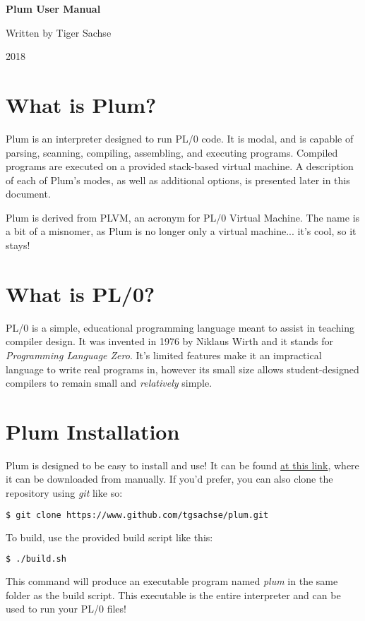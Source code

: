 \documentclass[12pt]{memoir}
\begin{document}
\pagestyle{empty}

\begin{vplace}[.7]
\begin{center}
{\Huge
    \textbf{Plum User Manual}
}

{\Large 
    Written by Tiger Sachse

    2018
}
\end{center}
\end{vplace}

\pagebreak

\pagestyle{plain}
\setcounter{page}{1}

\section*{What is Plum?}
Plum is an interpreter designed to run PL/0 code. It is modal, and is capable of parsing,
scanning, compiling, assembling, and executing programs. Compiled programs are executed
on a provided stack-based virtual machine. A description of each of Plum's modes, as well
as additional options, is presented later in this document.

Plum is derived from PLVM, an acronym for PL/0 Virtual Machine. The name is a bit of a
misnomer, as Plum is no longer only a virtual machine... it's cool, so it stays!

\section*{What is PL/0?}
PL/0 is a simple, educational programming language meant to assist in teaching compiler
design. It was invented in 1976 by Niklaus Wirth and it stands for
\textit{Programming Language Zero}. It's limited features make it an impractical language
to write real programs in, however its small size allows student-designed compilers to
remain small and \textit{relatively} simple.

\section*{Plum Installation}
Plum is designed to be easy to install and use! It can be found 
\href{https://www.github.com/tgsachse/plum}{at this link}, where it can be downloaded
from manually. If you'd prefer, you can also clone the repository using \emph{git} like so:
\begin{lstlisting}[language=bash]
$ git clone https://www.github.com/tgsachse/plum.git
\end{lstlisting}
To build, use the provided build script like this:
\begin{lstlisting}[language=bash]
$ ./build.sh
\end{lstlisting}
This command will produce an executable program named \emph{plum} in the same folder as
the build script. This executable is the entire interpreter and can be used to run
your PL/0 files!
\end{document}
